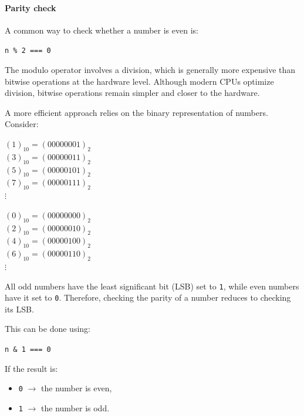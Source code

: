 \documentclass{scrbook}
\begin{document}
\paragraph{Parity check}

A common way to check whether a number is even is:

\begin{center}
    \texttt{n \% 2 === 0}
\end{center}

The modulo operator involves a division, which is generally more expensive than bitwise operations at the hardware level. Although modern CPUs optimize division, bitwise operations remain simpler and closer to the hardware.

A more efficient approach relies on the binary representation of numbers. Consider:

\begin{center}
    $(1)_{10} = (00000001)_{2}$\\
    $(3)_{10} = (00000011)_{2}$\\
    $(5)_{10} = (00000101)_{2}$\\
    $(7)_{10} = (00000111)_{2}$\\
    $\vdots$
\end{center}

\begin{center}
    $(0)_{10} = (00000000)_{2}$\\
    $(2)_{10} = (00000010)_{2}$\\
    $(4)_{10} = (00000100)_{2}$\\
    $(6)_{10} = (00000110)_{2}$\\
    $\vdots$
\end{center}

All odd numbers have the least significant bit (LSB) set to \texttt{1}, while even numbers have it set to \texttt{0}. Therefore, checking the parity of a number reduces to checking its LSB.

This can be done using:

\begin{center}
    \texttt{n \& 1 === 0}
\end{center}

If the result is:
\begin{itemize}
    \item \texttt{0} $\rightarrow$ the number is even,
    \item \texttt{1} $\rightarrow$ the number is odd.
\end{itemize}
\end{document}
